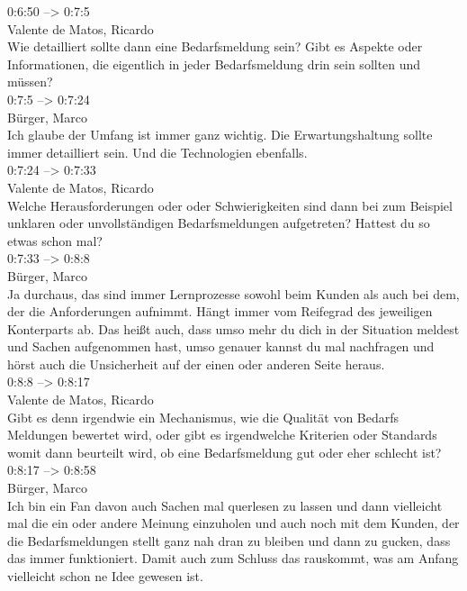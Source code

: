 0:6:50 --> 0:7:5\\
Valente de Matos, Ricardo\\
Wie detailliert sollte dann eine Bedarfsmeldung sein? Gibt es Aspekte oder Informationen, die eigentlich in jeder Bedarfsmeldung drin sein sollten und müssen?\\

0:7:5 --> 0:7:24\\
Bürger, Marco\\
Ich glaube der Umfang ist immer ganz wichtig. Die Erwartungshaltung sollte immer detailliert sein. Und die Technologien ebenfalls.\\

0:7:24 --> 0:7:33\\
Valente de Matos, Ricardo\\
Welche Herausforderungen oder oder Schwierigkeiten sind dann bei zum Beispiel unklaren oder unvollständigen Bedarfsmeldungen aufgetreten? Hattest du so etwas schon mal?\\

0:7:33 --> 0:8:8\\
Bürger, Marco\\
Ja durchaus, das sind immer Lernprozesse sowohl beim Kunden als auch bei dem, der die Anforderungen aufnimmt. Hängt immer vom Reifegrad des jeweiligen Konterparts ab. Das heißt auch, dass umso mehr du dich in der Situation meldest und Sachen aufgenommen hast, umso genauer kannst du mal nachfragen und hörst auch die Unsicherheit auf der einen oder anderen Seite heraus.\\

0:8:8 --> 0:8:17\\
Valente de Matos, Ricardo\\
Gibt es denn irgendwie ein Mechanismus, wie die Qualität von Bedarfs Meldungen bewertet wird, oder gibt es irgendwelche Kriterien oder Standards womit dann beurteilt wird, ob eine Bedarfsmeldung gut oder eher schlecht ist?\\

0:8:17 --> 0:8:58\\
Bürger, Marco\\
Ich bin ein Fan davon auch Sachen mal querlesen zu lassen und dann vielleicht mal die ein oder andere Meinung einzuholen und auch noch mit dem Kunden, der die Bedarfsmeldungen stellt ganz nah dran zu bleiben und dann zu gucken, dass das immer funktioniert. Damit auch zum Schluss das rauskommt, was am Anfang vielleicht schon ne Idee gewesen ist.\\

